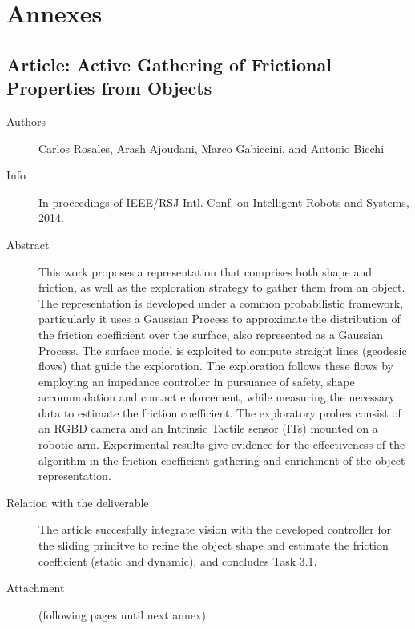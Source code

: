 \documentclass[a4paper,11pt,pdf]{pacmanreport}
\begin{document}
% 
\newpage



\newpage
\appendix
\section{Annexes}
\label{sec:annex}


\subsection{Article: Active Gathering of Frictional Properties from Objects} \label{sec:slidingPointClouds}
\begin{description}
	\item[Authors] Carlos Rosales, Arash Ajoudani, Marco Gabiccini, and Antonio Bicchi
	\item[Info] In proceedings of IEEE/RSJ Intl. Conf. on Intelligent Robots and Systems, 2014.
	\item[Abstract] This work proposes a representation that comprises both shape and friction, as well as the exploration strategy to gather them from an object. The representation is developed under a common probabilistic framework, particularly it uses a Gaussian Process to approximate the distribution of the friction coefficient over the surface, also represented as a Gaussian Process. The surface model is exploited to compute straight lines (geodesic flows) that guide the exploration. The exploration follows these flows by employing an impedance
controller in pursuance of safety, shape accommodation and contact enforcement, while measuring the necessary data to estimate the friction coefficient. The exploratory probes consist of an RGBD camera and an Intrinsic Tactile sensor (ITs) mounted on a robotic arm. Experimental results give evidence for the effectiveness of the algorithm in the friction coefficient gathering and enrichment of the object representation.
	\item[Relation with the deliverable] The article succesfully integrate vision with the developed controller for the sliding primitve to refine the object shape and estimate the friction coefficient (static and dynamic), and concludes Task 3.1.
	\item[Attachment] (following pages until next annex)
\end{description}

\end{document}
